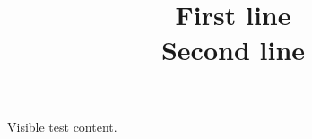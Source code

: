 \documentclass[paper=A4]{ropas-poster}
\title{First line\\Second line}\posterSetHeaderLeading{20bp}
\begin{document}
Visible test content.
\end{document}
